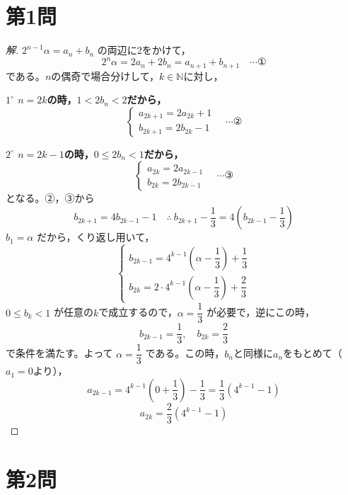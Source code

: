 \documentclass[../main.tex]{subfiles}
\begin{document}
\section*{第1問}

\begin{proof}[解]
  $2^{n-1}\alpha=a_n+b_n$ の両辺に2をかけて，
  \[
    2^n\alpha=2a_n+2b_n=a_{n+1}+b_{n+1} \quad \cdots \text{①}
  \]
  である。$n$の偶奇で場合分けして，$k\in\mathbb{N}$に対し，

  \textbf{$1^\circ$ $n=2k$の時，$1<2b_n<2$だから，}
  \[
    \begin{cases}
      a_{2k+1}=2a_{2k}+1 \\
      b_{2k+1}=2b_{2k}-1
    \end{cases}
    \quad \cdots \text{②}
  \]

  \textbf{$2^\circ$ $n=2k-1$の時，$0\le2b_n<1$だから，}
  \[
    \begin{cases}
      a_{2k}=2a_{2k-1} \\
      b_{2k}=2b_{2k-1}
    \end{cases}
    \quad \cdots \text{③}
  \]
  となる。②，③から
  \[
    b_{2k+1}=4b_{2k-1}-1 \quad\therefore\ b_{2k+1}-\frac13=4\left(b_{2k-1}-\frac13\right)
  \]
  $b_1=\alpha$ だから，くり返し用いて，
  \[
    \begin{cases}
      b_{2k-1}=4^{k-1}\left(\alpha-\dfrac13\right)+\dfrac13 \\
      b_{2k}=2\cdot4^{k-1}\left(\alpha-\dfrac13\right)+\dfrac23
    \end{cases}
  \]
  $0\le b_k<1$ が任意の$k$で成立するので，$\alpha=\dfrac13$ が必要で，逆にこの時，
  \[
    b_{2k-1}=\frac13,\quad b_{2k}=\frac23
  \]
  で条件を満たす。よって $\alpha=\dfrac13$ である。この時，$b_n$と同様に$a_n$をもとめて（$a_1=0$より），
  \[
    a_{2k-1}=4^{k-1}\left(0+\frac13\right)-\frac13=\frac13\left(4^{k-1}-1\right)
  \]
  \[
    a_{2k}=\frac23\left(4^{k-1}-1\right)
  \]
\end{proof}

\newpage

\section*{第2問}
\end{document}
